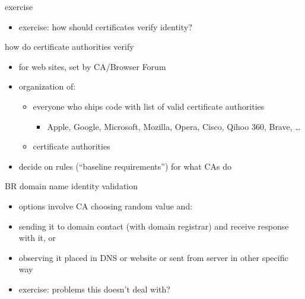 \begin{frame}{exercise}
    \begin{itemize}
    \item exercise: how should certificates verify identity?
    \end{itemize}
\end{frame}

\begin{frame}{how do certificate authorities verify}
    \begin{itemize}
        \item for web sites, set by CA/Browser Forum
        \item organization of:
            \begin{itemize}
            \item everyone who ships code with list of valid certificate authorities
                \begin{itemize}
                \item Apple, Google, Microsoft, Mozilla, Opera, Cisco, Qihoo 360, Brave, \ldots
                \end{itemize}
            \item certificate authorities
            \end{itemize}
        \item decide on rules (``baseline requirements'') for what CAs do
    \end{itemize}
\end{frame}

\begin{frame}{BR domain name identity validation}
    \begin{itemize}
        \item options involve CA choosing random value and:
        \vspace{.5cm}
        \item sending it to domain contact (with domain registrar) and receive response with it, or
        \item observing it placed in DNS or website or sent from server in other specific way
        \vspace{1cm}
        \item exercise: problems this doesn't deal with?
    \end{itemize}
\end{frame}

